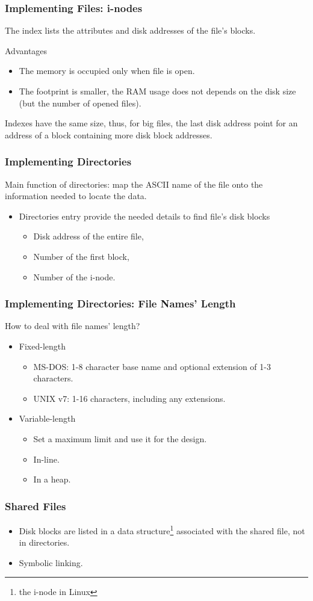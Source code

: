 \begin{frame}
    \frametitle{Implementing Files: i-nodes}
    The index lists the attributes and disk addresses of the file's blocks.
    \begin{block}{Advantages}
        \begin{itemize}
            \item The memory is occupied only when file is open.
            \item The footprint is smaller, the RAM usage does not depends on the disk size (but the number of opened files).
        \end{itemize}
    \end{block}
    Indexes have the same size, thus, for big files, the last disk address point for an address of a block containing more disk block addresses.
\end{frame}

\begin{frame}
    \frametitle{Implementing Directories}
    Main function of directories: map the ASCII name of the file onto the information needed to locate the data.
    \begin{itemize}
        \item Directories entry provide the needed details to find file's disk blocks
            \begin{itemize}
                \item Disk address of the entire file,
                \item Number of the first block,
                \item Number of the i-node.
            \end{itemize}
    \end{itemize}
\end{frame}

\begin{frame}
    \frametitle{Implementing Directories: File Names' Length}
    How to deal with file names' length?
    \begin{itemize}
        \item Fixed-length
        \begin{itemize}
            \item MS-DOS: 1-8 character base name and optional extension of 1-3 characters.
            \item UNIX v7: 1-16 characters, including any extensions.
        \end{itemize}
        \item Variable-length
        \begin{itemize}
            \item Set a maximum limit and use it for the design.
            \item In-line.
            \item In a heap.
        \end{itemize}
    \end{itemize}
\end{frame}

\begin{frame}
    \frametitle{Shared Files}
    \begin{itemize}
        \item Disk blocks are listed in a data structure\footnote{the i-node in Linux} associated with the shared file, not in directories.
        \item Symbolic linking.
    \end{itemize}
\end{frame}
